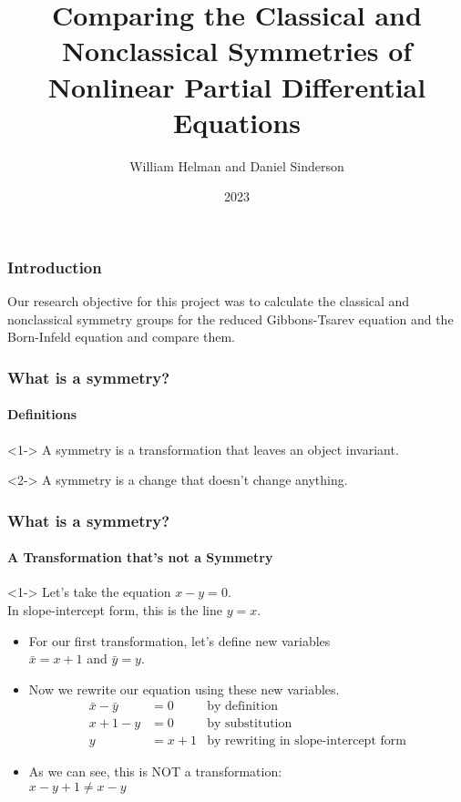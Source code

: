 \documentclass{beamer}
\title{Comparing the Classical and Nonclassical Symmetries of Nonlinear Partial Differential Equations}
\author{William Helman and Daniel Sinderson}
\institute{Southern Oregon University}
\date{2023}
\begin{document}
\frame{\titlepage}



\begin{frame}
    \frametitle{Introduction}
    Our research objective for this project was to calculate the classical and nonclassical symmetry groups for the reduced Gibbons-Tsarev equation and the Born-Infeld equation and compare them.
\end{frame}



\begin{frame}
    \frametitle{What is a symmetry?}
    \framesubtitle{Definitions}
    \begin{definition}<1->
        A symmetry is a transformation that leaves an object invariant.
    \end{definition}

    \begin{definition}<2->
        A symmetry is a change that doesn't change anything.
    \end{definition}
    
\end{frame}

\begin{frame}
    \frametitle{What is a symmetry?}
    \framesubtitle{A Transformation that's not a Symmetry}
    \begin{example}[1]<1->
        Let's take the equation $x-y=0$.
        \\In slope-intercept form, this is the line $y=x$.
        \begin{itemize}
            \item For our first transformation, let's define new variables\\ $\bar{x}=x+1$ and $\bar{y}=y$.
            \item Now we rewrite our equation using these new variables. \begin{equation*}
                \begin{aligned}
                    \bar{x}-\bar{y} &= 0 & \text{by definition} \\
                    x+1-y &= 0 & \text{by substitution} \\
                    y &= x+1 & \text{by rewriting in slope-intercept form}
                \end{aligned}
            \end{equation*}
            \item As we can see, this is NOT a transformation: \\ $x-y+1\ne x-y$
        \end{itemize}        
    \end{example}
\end{frame}
\end{document}
